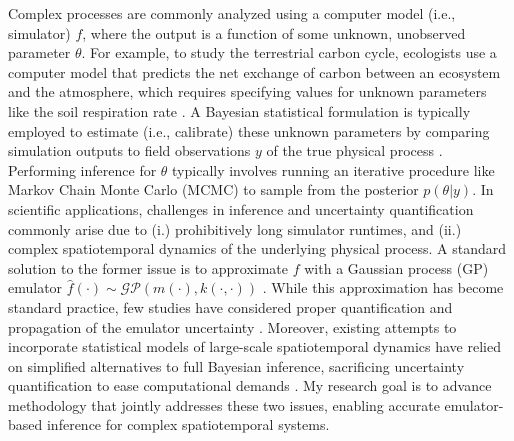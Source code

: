 \documentclass[11pt]{article}
\begin{document}
Complex processes are commonly analyzed using a computer model (i.e., simulator) $f$, where the output is a function of some unknown, unobserved parameter $\theta$.
For example, to study the terrestrial carbon cycle, ecologists use a computer model 
that predicts the net exchange of carbon between an ecosystem and the atmosphere, which requires specifying values for unknown parameters like the soil respiration rate \cite{Fer}.
A Bayesian statistical formulation is typically employed to estimate (i.e., calibrate) these unknown parameters by comparing simulation outputs to field observations $y$ of the true physical process \cite{Kennedy}. Performing inference for $\theta$ typically involves running an iterative procedure like Markov Chain Monte Carlo (MCMC) to sample from the posterior $p(\theta|y)$. In scientific applications, challenges in inference and uncertainty quantification commonly arise due to (i.) prohibitively long simulator runtimes, and (ii.) complex spatiotemporal dynamics of the underlying physical process. A standard solution to the former issue is to approximate $f$ with a Gaussian process (GP) emulator $\hat{f}(\cdot) \sim \mathcal{GP}(m(\cdot), k(\cdot, \cdot))$ \cite{Fer, Kennedy, Cleary}. While this approximation has become standard practice, few studies have considered proper quantification and propagation of the emulator uncertainty \cite{Fer, Cleary}. Moreover, existing attempts to incorporate statistical models of large-scale spatiotemporal dynamics have relied on simplified alternatives to full Bayesian inference, sacrificing uncertainty quantification to ease computational demands \cite{Sun}.
My research goal is to advance methodology that jointly addresses these two issues, enabling accurate emulator-based inference for complex spatiotemporal systems. 

\end{document}
